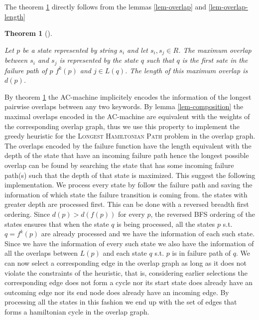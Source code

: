 \documentclass[english,twoside,censored,csm,algorithms-track-2020]{HYthesisML}
\theoremstyle{plain}
\newtheorem{theorem}{Theorem}[chapter]
\theoremstyle{definition}
\begin{document}
The theorem \ref{thm-maximal-overlaps} directly follows from the lemmas \ref{lem-overlap} and \ref{lem-overlap-length}

\begin{theorem}[] ~\label{thm-maximal-overlaps}

  Let $p$ be a state represented by string $s_i$ and let $s_i,s_j\in R$. The maximum overlap between
  $s_i$ and $s_j$ is represented by the state $q$ such that $q$ is the first sate in the failure
  path of $p$ $f^k(p)$ and $j\in L(q)$. The length of this maximum overlap is $d(p)$.

\end{theorem}
  
By theorem \ref{thm-maximal-overlaps} the AC-machine implicitely encodes the information of the
longest pairwise overlaps between any two keywords. By lemma \ref{lem-composition} the maximal
overlaps encoded in the AC-machine are equivalent with the weights of the corresponding overlap
graph, thus we use this property to implement the greedy heuristic for the
\textsc{Longest Hamiltonian Path} problem in the overlap graph. The overlaps encoded by the
failure function have the length equivalent with the depth of the state that have an incoming
failure path hence the longest possible overlap can be found by searching the state
that has some incoming failure path(s) such that the depth of that state is maximized. This suggest
the following implementation. We process every state by follow the failure path and saving the
information of which state the failure transition is coming from. 
the states with greater depth are processed first. This can be done with a reversed breadth
first ordering. Since $d(p) > d(f(p))$ for every $p$, the reversed BFS ordering of the states
ensures that when the state $q$ is being processed, all the states $p$ s.t. $q=f^k(p)$ are already
processed and we have the information of each such state. Since we have the information of every such
state we also have the information of all the overlaps between $L(p)$ and each state $q$ s.t.
$p$ is in failure path of $q$. We can now select a corresponding edge in the overlap graph as long
as it does not violate the constraints of the heuristic, that is, considering earlier selections
the corresponding edge does not form a cycle nor its start state does already have an outcoming
edge nor its end node does already have an incoming edge. By processing all the states in this
fashion we end up with the set of edges that forms a hamiltonian cycle in the
overlap graph. 
\end{document}
